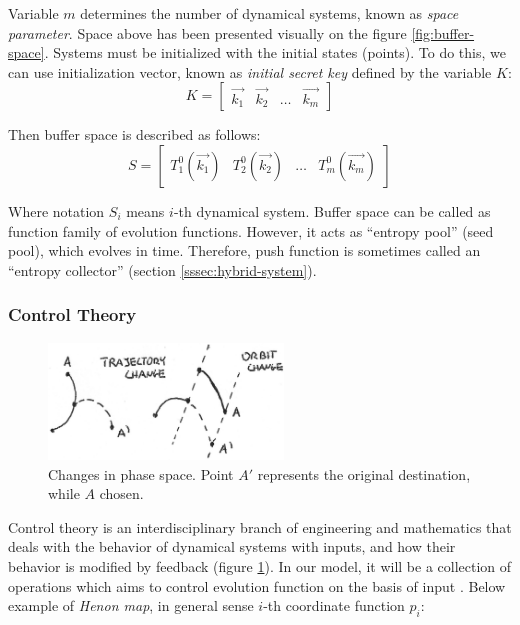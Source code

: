 \documentclass[twocolumn, a4paper, 10pt]{article}
\begin{document}
Variable $m$ determines the number of dynamical systems, known as \textit{space parameter}. Space above has been presented visually on the figure \ref{fig:buffer-space}. Systems must be initialized with the initial states (points). To do this, we can use initialization vector, known as \textit{initial secret key} defined by the variable $K$: $$K = \begin{bmatrix} \vec{k_1} & \vec{k_2} & \dots & \vec{k_m} \end{bmatrix}$$

Then buffer space is described as follows: $$S = \begin{bmatrix} T^0_1(\vec{k_1}) & T^0_2(\vec{k_2}) & \dots & T^0_m(\vec{k_m}) \end{bmatrix}$$

Where notation $S_i$ means $i$-th dynamical system. Buffer space can be called as function family of evolution functions. However, it acts as ``entropy pool'' (seed pool), which evolves in time. Therefore, push function is sometimes called an ``entropy collector'' (section \ref{sssec:hybrid-system}).

\subsubsection{Control Theory}
\label{sssec:control-theory}

\begin{figure}[ht]
  \centering
  \includegraphics[width=6.25cm]{control-theory.jpeg}
  \caption{Changes in phase space. Point $A\prime$ represents the original destination, while $A$ chosen.}
  \label{fig:control-theory}
\end{figure}

Control theory is an interdisciplinary branch of engineering and mathematics that deals with the behavior of dynamical systems with inputs, and how their behavior is modified by feedback (figure \ref{fig:control-theory}). In our model, it will be a collection of operations which aims to control evolution function on the basis of input \cite{2006math......3133H}. Below example of \textit{Henon map}, in general sense $i$-th coordinate function $p_i$:
\end{document}
